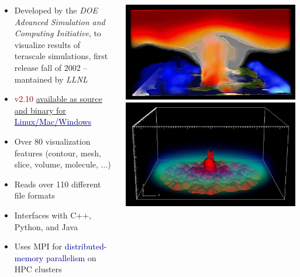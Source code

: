 \begin{frame}
\begin{columns}
\begin{column}{7.65cm}
\begin{small}
\begin{itemize}
        \item Developed by the \textit{DOE Advanced Simulation and Computing Initiative}, %
 to visualize results of terascale simulations, first release fall of 2002 -- mantained by \textit{LLNL}
        \item \textcolor{DarkRed}{v2.10} \href{https://wci.llnl.gov/simulation/computer-codes/visit/downloads}{available as source and binary for \textcolor{DarkBlue}{Linux/Mac/Windows}}
        \item Over 80 visualization features (contour, mesh, slice, volume, molecule, ...)
        \item Reads over 110 different file formats
        \item Interfaces with C++, Python, and Java
        \item Uses MPI for \textcolor{DarkBlue}{distributed-memory parallelism} on HPC clusters
\end{itemize}
\end{small}
\end{column}
\begin{column}{5cm}
	\vspace{-2mm}

        \href{https://wci.llnl.gov/simulation/computer-codes/visit/gallery}{\includegraphics[width=.475\columnwidth]{figs/visit-exs/VisIt-gallery_33}}
        \href{https://wci.llnl.gov/simulation/computer-codes/visit/gallery}{\includegraphics[width=.475\columnwidth]{figs/visit-exs/VisIt-gallery_10}}


\end{column}
\end{columns}
\end{frame}
